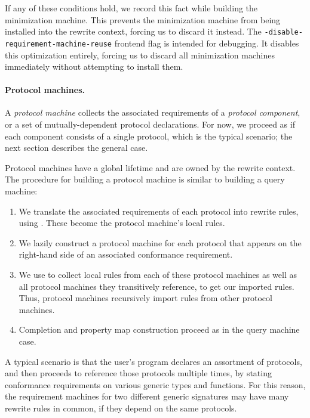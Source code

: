 \documentclass[../generics]{subfiles}
\begin{document}
If any of these conditions hold, we record this fact while building the minimization machine. This prevents the minimization machine from being installed into the rewrite context, forcing us to discard it instead. The \texttt{-disable-requirement-machine-reuse} frontend flag is intended for debugging. It disables this optimization entirely, forcing us to discard all minimization machines immediately without attempting to install them.

\paragraph{Protocol machines.}
A \emph{protocol machine} collects the associated requirements of a \emph{protocol component}, or a set of mutually-dependent protocol declarations. For now, we proceed as if each component consists of a single protocol, which is the typical scenario; the next section describes the general case.

Protocol machines have a global lifetime and are owned by the rewrite context. The procedure for building a protocol machine is similar to building a query machine:
\begin{enumerate}
\item We translate the associated requirements of each protocol into rewrite rules, using . These become the protocol machine's local rules.
\item We lazily construct a protocol machine for each protocol that appears on the right-hand side of an associated conformance requirement.
\item We use  to collect local rules from each of these protocol machines as well as all protocol machines they transitively reference, to get our imported rules. Thus, protocol machines recursively import rules from other protocol machines.
\item Completion and property map construction proceed as in the query machine case.
\end{enumerate}

A typical scenario is that the user's program declares an assortment of protocols, and then proceeds to reference those protocols multiple times, by stating conformance requirements on various generic types and functions. For this reason, the requirement machines for two different generic signatures may have many rewrite rules in common, if they depend on the same protocols.
\end{document}
